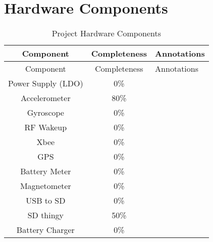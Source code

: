 \section{Hardware Components}

    \begin{center}
     \setlength{\extrarowheight}{0.6cm}
    \begin{longtable}{|c|c|m{3.1in}|}
        \caption{Project Hardware Components \label{tab:hwComp}} \\
        \hline
        \rowcolor{Gray}
        Component & Completeness & {\centering Annotations} \\ \hline \hline \endfirsthead
        \hline
        \rowcolor{Gray}
        Component & Completeness & {\centering Annotations} \\ \hline \hline \endhead
        \endfoot
       
        Power Supply (LDO) & 0\%   &  \\ \hline
        Accelerometer & 80\%  &  \\ \hline
        Gyroscope & 0\%   &  \\ \hline
        RF Wakeup & 0\%   &  \\ \hline
        Xbee  & 0\%   &  \\ \hline
        GPS   & 0\%   &  \\ \hline
        Battery Meter & 0\%   &  \\ \hline
        Magnetometer & 0\%   &  \\ \hline
        USB to SD & 0\%   &  \\ \hline
        SD thingy & 50\%  &  \\ \hline
        Battery Charger & 0\%   &  \\ \hline
    \end{longtable}
    \end{center}

